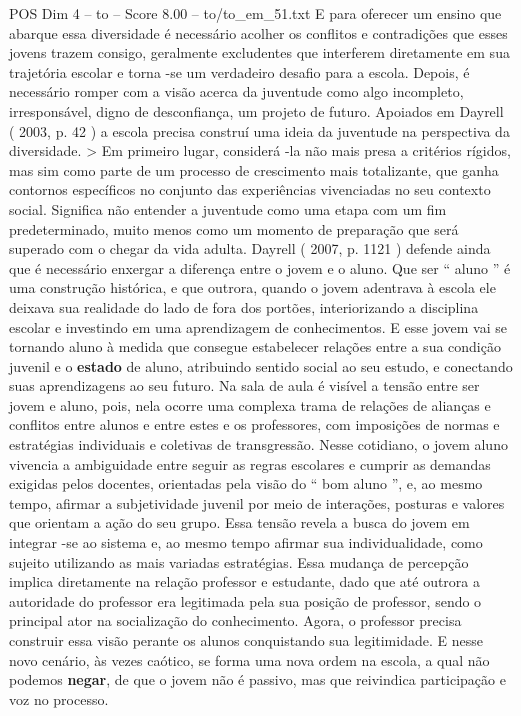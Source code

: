 \begin{textsample}{POS Dim 4 – to – Score 8.00 – to/to\_em\_51.txt}
E para oferecer um ensino que abarque essa diversidade é necessário acolher os conflitos e contradições que esses jovens trazem consigo, geralmente excludentes que interferem diretamente em sua trajetória escolar e torna -se um verdadeiro desafio para a escola.
Depois, é necessário romper com a visão acerca da juventude como algo incompleto, irresponsável, digno de desconfiança, um projeto de futuro.
Apoiados em Dayrell ( 2003, p. 42 ) a escola precisa construí uma ideia da juventude na perspectiva da diversidade. > Em primeiro lugar, considerá -la não mais presa a critérios rígidos, mas sim como parte de um processo de crescimento mais totalizante, que ganha contornos específicos no conjunto das experiências vivenciadas no seu contexto social.
Significa não entender a juventude como uma etapa com um fim predeterminado, muito menos como um momento de preparação que será superado com o chegar da vida adulta.
Dayrell ( 2007, p. 1121 ) defende ainda que é necessário enxergar a diferença entre o jovem e o aluno.
Que ser “ aluno ” é uma construção histórica, e que outrora, quando o jovem adentrava à escola ele deixava sua realidade do lado de fora dos portões, interiorizando a disciplina escolar e investindo em uma aprendizagem de conhecimentos.
E esse jovem vai se tornando aluno à medida que consegue estabelecer relações entre a sua condição juvenil e o \textbf{estado} de aluno, atribuindo sentido social ao seu estudo, e conectando suas aprendizagens ao seu futuro.
Na sala de aula é visível a tensão entre ser jovem e aluno, pois, nela ocorre uma complexa trama de relações de alianças e conflitos entre alunos e entre estes e os professores, com imposições de normas e estratégias individuais e coletivas de transgressão.
Nesse cotidiano, o jovem aluno vivencia a ambiguidade entre seguir as regras escolares e cumprir as demandas exigidas pelos docentes, orientadas pela visão do “ bom aluno ”, e, ao mesmo tempo, afirmar a subjetividade juvenil por meio de interações, posturas e valores que orientam a ação do seu grupo.
Essa tensão revela a busca do jovem em integrar -se ao sistema e, ao mesmo tempo afirmar sua individualidade, como sujeito utilizando as mais variadas estratégias.
Essa mudança de percepção implica diretamente na relação professor e estudante, dado que até outrora a autoridade do professor era legitimada pela sua posição de professor, sendo o principal ator na socialização do conhecimento.
Agora, o professor precisa construir essa visão perante os alunos conquistando sua legitimidade.
E nesse novo cenário, às vezes caótico, se forma uma nova ordem na escola, a qual não podemos \textbf{negar}, de que o jovem não é passivo, mas que reivindica participação e voz no processo.

\end{textsample}
